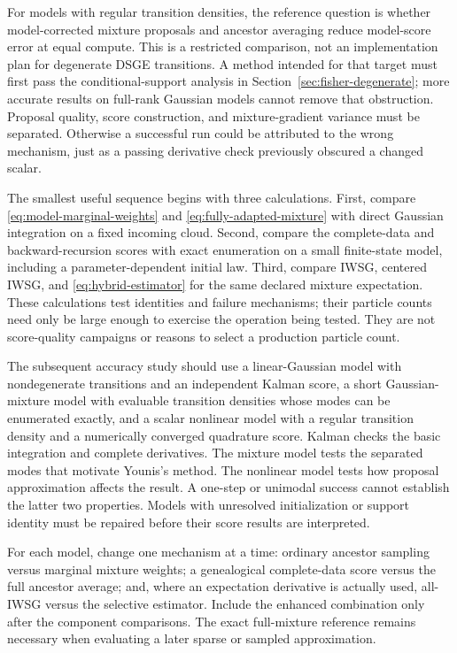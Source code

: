 \documentclass[11pt]{article}
\begin{document}
For models with regular transition densities, the reference question is
whether model-corrected mixture proposals and ancestor averaging reduce
model-score error at equal compute. This is a restricted comparison, not an
implementation plan for degenerate DSGE transitions. A method intended for
that target must first pass the conditional-support analysis in
Section~\ref{sec:fisher-degenerate}; more accurate results on full-rank
Gaussian models cannot remove that obstruction. Proposal
quality, score construction, and mixture-gradient variance must be separated.
Otherwise a successful run could be attributed to the wrong mechanism, just
as a passing derivative check previously obscured a changed scalar.

The smallest useful sequence begins with three calculations. First, compare
\eqref{eq:model-marginal-weights} and
\eqref{eq:fully-adapted-mixture} with direct Gaussian integration on a fixed
incoming cloud. Second, compare the complete-data and backward-recursion
scores with exact enumeration on a small finite-state model, including a
parameter-dependent initial law. Third, compare IWSG, centered IWSG, and
\eqref{eq:hybrid-estimator} for the same declared mixture expectation.
These calculations test identities and failure mechanisms; their particle
counts need only be large enough to exercise the operation being tested.
They are not score-quality campaigns or reasons to select a production
particle count.

The subsequent accuracy study should use a linear-Gaussian model with
nondegenerate transitions and an independent Kalman score, a short
Gaussian-mixture model with evaluable transition densities whose modes can be
enumerated exactly, and a scalar nonlinear model with a regular transition
density and a numerically converged quadrature score. Kalman checks the basic
integration and complete derivatives.
The mixture model tests the separated modes that motivate Younis's method.
The nonlinear model tests how proposal approximation affects the result.
A one-step or unimodal success cannot establish the latter two properties.
Models with unresolved initialization or support identity must be repaired
before their score results are interpreted.

For each model, change one mechanism at a time: ordinary ancestor sampling
versus marginal mixture weights; a genealogical complete-data score versus
the full ancestor average; and, where an expectation derivative is actually
used, all-IWSG versus the selective estimator. Include the enhanced
combination only after the component comparisons. The exact full-mixture
reference remains necessary when evaluating a later sparse or sampled
approximation.
\end{document}
